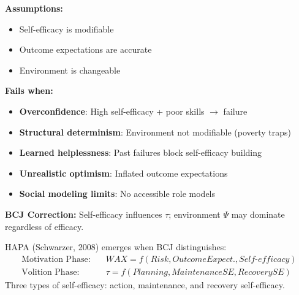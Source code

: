 \begin{tcolorbox}[colback=red!5!white, colframe=red!75!black, title=Boundary Condition: Where SCT-Health Fails]
\textbf{Assumptions:}
\begin{itemize}[nosep]
\item Self-efficacy is modifiable
\item Outcome expectations are accurate
\item Environment is changeable
\end{itemize}

\textbf{Fails when:}
\begin{itemize}[nosep]
\item \textbf{Overconfidence}: High self-efficacy + poor skills $\to$ failure
\item \textbf{Structural determinism}: Environment not modifiable (poverty traps)
\item \textbf{Learned helplessness}: Past failures block self-efficacy building
\item \textbf{Unrealistic optimism}: Inflated outcome expectations
\item \textbf{Social modeling limits}: No accessible role models
\end{itemize}

\textbf{BCJ Correction:} Self-efficacy influences $\tau$; environment $\Psi$ may dominate regardless of efficacy.
\end{tcolorbox}


\begin{theorem}
\label{thm:hapa}
HAPA (Schwarzer, 2008) emerges when BCJ distinguishes:
\begin{equation}
\boxed{
\begin{aligned}
\text{Motivation Phase:} & \quad WAX = f(Risk, Outcome Expect., Self\text{-}efficacy) \\
\text{Volition Phase:} & \quad \tau = f(Planning, Maintenance SE, Recovery SE)
\end{aligned}
}
\end{equation}
Three types of self-efficacy: action, maintenance, and recovery self-efficacy.
\end{theorem}

